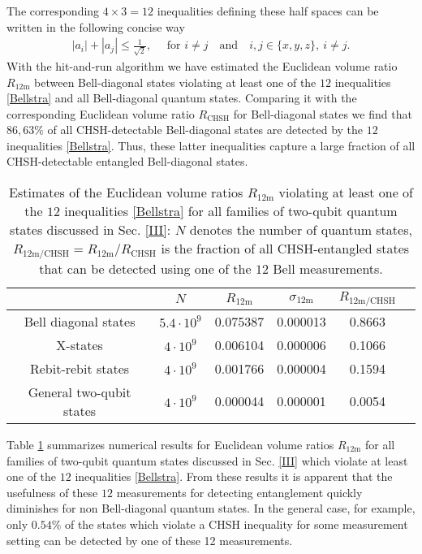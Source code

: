 \documentclass[12pt]{iopart}
\begin{document}
The corresponding $4\times 3 = 12$ inequalities defining these half spaces can
be written in the following concise way
\begin{eqnarray}
 |a_i| + |a_j| \leqslant \frac{1}{\sqrt{2}}, \quad \text{ for } i \neq j \quad \text{and}\quad  i,j \in \{x,y,z\} ,~ i \neq j. \label{Bellstra} 
\end{eqnarray}
With the hit-and-run algorithm we have estimated the Euclidean volume ratio $R_{\text{12m}}$ between Bell-diagonal states violating at least one of the $12$ inequalities \eqref{Bellstra} and all Bell-diagonal quantum states. Comparing it with the corresponding Euclidean volume ratio $R_{\text{CHSH}}$ for Bell-diagonal states we find that $86,63\%$ of all CHSH-detectable Bell-diagonal states are detected by the
$12$ inequalities \eqref{Bellstra}. Thus, these latter inequalities capture a large fraction of all CHSH-detectable entangled Bell-diagonal states.

\begin{table}[H]
\centering
\begin{tabular}{|c|c|c|c|c|c|}
\hline
 & $N$  & $R_{\text{12m}}$&$\sigma_{\text{12m}}$ & $R_{\text{12m/CHSH}}$ \\
\hline
Bell diagonal states & $5.4 \cdot 10^9$  & 0.075387 & 0.000013 & 0.8663 \\
\hline
X-states & $4\cdot 10^9$  & 0.006104 & 0.000006 & 0.1066\\
\hline
Rebit-rebit states & $4\cdot 10^9$ & 0.001766 & 0.000004 & 0.1594 \\
\hline
General two-qubit states& $4\cdot 10^9$ & 0.000044 & 0.000001 & 0.0054\\
\hline
\end{tabular}
\caption{
Estimates of the Euclidean volume ratios $R_{\text{12m}}$ 
violating at least one of the $12$ inequalities \eqref{Bellstra}
for all families of two-qubit quantum states discussed in Sec. \ref{III}: $N$ denotes the number of quantum states, 
$R_{\text{12m/CHSH}} = R_{\text{12m}}/R_{\text{CHSH}}$ is the 
fraction of all CHSH-entangled states that can be detected using one of the $12$ Bell measurements. }
\label{tab:qbqb12m}
\end{table}

Table \ref{tab:qbqb12m} summarizes numerical results for
Euclidean volume ratios $R_{\text{12m}}$ for all families of two-qubit quantum states discussed in Sec. \ref{III} which violate at least one of the $12$ inequalities \eqref{Bellstra}. From these results it is apparent that
the usefulness of these $12$ measurements for detecting entanglement quickly diminishes for non Bell-diagonal quantum states. 
In the general case, for example, only $0.54\%$ of the states which violate a CHSH inequality for some measurement setting can be detected by one of these 12 measurements.
\end{document}
